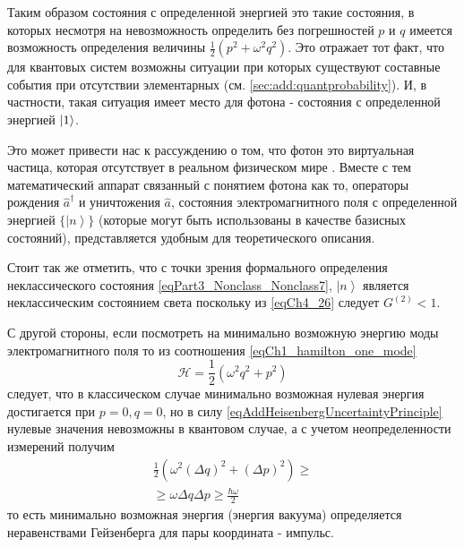 \begin{remark}
  Таким образом состояния с определенной энергией это такие состояния,
  в которых несмотря на невозможность определить без погрешностей $p$
  и $q$ имеется возможность определения величины 
  \(
  \frac{1}{2} \left(p^2 +
  \omega^2q^2\right)
  \). Это отражает тот факт, что для квантовых систем возможны
  ситуации при которых существуют составные события при отсутствии
  элементарных (см. \autoref{sec:add:quantprobability}). 
  И, в частности, такая ситуация имеет место для фотона
  - состояния с определенной энергией $\ket{1}$.

  Это может привести нас к рассуждению о том, что фотон это
  виртуальная частица, которая отсутствует в реальном физическом мире
  \cite{Lamb1995}. Вместе с тем математический аппарат связанный с
  понятием фотона как то, операторы рождения $\hat{a}^\dag$ и
  уничтожения $\hat{a}$, состояния электромагнитного поля с
  определенной энергией $\{\left|n\right>\}$ (которые могут быть
  использованы в качестве базисных состояний), представляется удобным
  для теоретического описания.

  Стоит так же отметить, что с точки зрения формального определения
  неклассического состояния \eqref{eqPart3_Nonclass_Nonclass7},
  $\left|n\right>$ является неклассическим 
  состоянием света поскольку из \eqref{eqCh4_26} следует $G^{(2)} <
  1$.

  С другой стороны, если посмотреть на минимально возможную энергию
  моды электромагнитного поля то из соотношения
  \eqref{eqCh1_hamilton_one_mode} 
  \[
  \mathcal{H} = \frac{1}{2}\left(\omega^2 q^2 + p^2\right)
  \]
  следует, что в классическом случае минимально возможная нулевая
  энергия достигается при $p = 0, q=0$, но в силу
  \eqref{eqAddHeisenbergUncertaintyPrinciple} нулевые значения
  невозможны в квантовом случае, а с учетом неопределенности измерений
  получим 
  \begin{eqnarray}
    \frac{1}{2}\left(\omega^2 (\Delta q)^2 + (\Delta p)^2\right) \ge
    \nonumber \\
    \ge \omega \Delta q \Delta p \ge \frac{\hbar \omega}{2}
    \nonumber
  \end{eqnarray}
  то есть минимально возможная энергия (энергия вакуума) определяется
  неравенствами Гейзенберга для пары координата - импульс.  
  \label{rem:antiphoton}
\end{remark}
